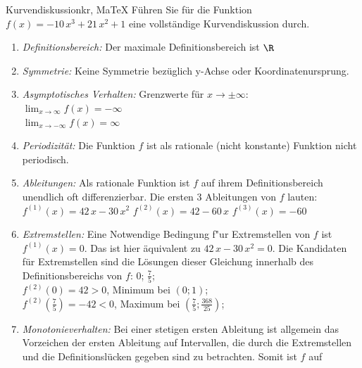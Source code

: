  \providecommand{\MoIl}{(} 
 \providecommand{\MoIr}{)}
 \providecommand{\MIntvlSep}{;} 
 \providecommand{\MElSetSep}{;} 
 \begin{MAufgabe}{Kurvendiskussion}{kr, MaTeX}
 F\"uhren Sie f\"ur die Funktion $f(x)= - 10\, x^3 + 21\, x^2 + 1$ eine vollst\"andige Kurvendiskussion durch.\\ 
 \ifLsg\Loesung
 \begin{enumerate}
 \item \emph{Definitionsbereich:} 
 Der maximale Definitionsbereich ist $\R$\item \emph{Symmetrie:} 
 Keine Symmetrie bez\"uglich y-Achse oder Koordinatenursprung.\item \emph{Asymptotisches Verhalten:} 
 Grenzwerte f\"ur $x\rightarrow \pm \infty$: \\ 
 $\lim_{x\rightarrow \infty} f(x)=- \infty$ \\ 
 $\lim_{x\rightarrow -\infty} f(x)=\infty$ \\ 
 \item \emph{Periodizit\"at:} 
 Die Funktion $f$ ist als rationale (nicht konstante) Funktion nicht periodisch.\item \emph{Ableitungen:} 
 Als rationale Funktion ist $f$ auf ihrem Definitionsbereich unendlich oft differenzierbar. 
 Die ersten 3 Ableitungen von $f$ lauten: \\ 
 $f^{(1)}(x)=42\, x - 30\, x^2$\newline 
  $f^{(2)}(x)=42 - 60\, x$\newline 
  $f^{(3)}(x)=-60$\newline 
  \item \emph{Extremstellen:} 
 Eine Notwendige Bedingung f"ur Extremstellen von $f$ ist $f^{(1)}(x)=0$. 
 Das ist hier \"aquivalent zu $42\, x - 30\, x^2=0$. 
 Die Kandidaten f\"ur Extremstellen sind die L\"osungen dieser Gleichung innerhalb des Definitionsbereichs von $f$: $0$; $\frac{7}{5}$; \\ 
 $f^{(2)}(0)=42$$>0$, Minimum bei $(0;1)$; \\ 
 $f^{(2)}(\frac{7}{5})=-42$$<0$, Maximum bei $(\frac{7}{5};\frac{368}{25})$; \\ 
 \item \emph{Monotonieverhalten:} 
 Bei einer stetigen ersten Ableitung ist allgemein das Vorzeichen der ersten Ableitung auf Intervallen, die durch die Extremstellen und die Definitionsl\"ucken gegeben sind zu betrachten. Somit ist $f$ auf \\ 

\end{enumerate}
\end{MAufgabe}
